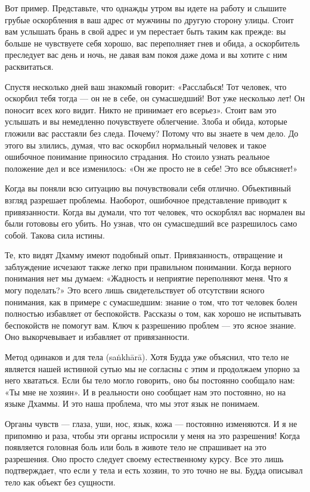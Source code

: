 Вот пример. Представьте, что однажды утром вы идете на работу и   слышите грубые оскорбления в ваш адрес от мужчины по другую сторону улицы. Стоит вам услышать брань в свой адрес и ум перестает быть таким как прежде: вы больше не чувствуете себя хорошо, вас переполняет гнев и обида, а оскорбитель преследует вас день и ночь, не давая вам покоя даже дома и вы хотите с ним расквитаться.

Спустя несколько дней ваш знакомый говорит: «Расслабься! Тот человек, что оскорбил тебя тогда — он не в себе, он сумасшедший! Вот уже несколько лет! Он поносит всех кого видит. Никто не принимает его всерьез». Стоит вам это услышать и вы немедленно почувствуете облегчение. Злоба и обида, которые гложили вас расстаяли без следа. Почему? Потому что вы знаете в чем дело. До этого вы злились, думая, что вас оскорбил нормальный человек и такое ошибочное понимание приносило страдания. Но стоило узнать реальное положение дел и все изменилось: «Он же просто не в себе! Это все объясняет!»

Когда вы поняли всю ситуацию вы почувствовали себя отлично. Объективный взгляд разрешает проблемы. Наоборот, ошибочное представление приводит к привязанности. Когда вы думали, что тот человек, что оскорблял вас нормален вы были готововы его убить. Но узнав, что он сумасшедший все разрешилось само собой. Такова сила истины.

Те, кто видят Дхамму имеют подобный опыт. Привязанность, отвращение и заблуждение исчезают также легко при правильном понимании. Когда верного понимания нет мы думаем: «Жадность и неприятие переполняют меня. Что я могу поделать?» Это всего лишь свидетельствует об отсутствии ясного понимания, как в примере с сумасшедшим: знание о том, что тот человек болен полностью избавляет от беспокойств. Рассказы о том, как хорошо не испытывать беспокойств не помогут вам. Ключ к разрешению проблем — это ясное знание. Оно выкорчевывает и избавляет от привязанности.

Метод одинаков и для тела (sa\.nkh\={a}r\={a}). Хотя Будда уже объяснил, что тело не является нашей истинной сутью мы не согласны с этим и продолжаем упорно за него хвататься. Если бы тело могло говорить, оно бы постоянно сообщало нам: «Ты мне не хозяин». И в реальности оно сообщает нам это постоянно, но на языке Дхаммы. И это наша проблема, что мы этот язык не понимаем.

Органы чувств — глаза, уши, нос, язык, кожа — постоянно изменяются. И я не припомню и раза, чтобы эти органы испросили у меня на это разрешения! Когда появляется головная боль или боль в животе тело не спрашивает на это разрешения. Оно просто следует своему естественному курсу. Все это лишь подтверждает, что если у тела и есть хозяин, то это точно не вы. Будда описывал тело как объект без сущности.

